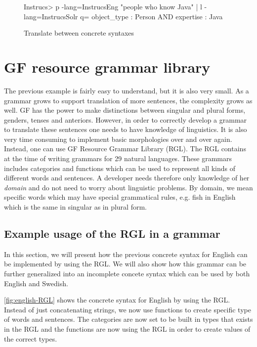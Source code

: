 \begin{figure}[H]
\begin{terminal}
Instrucs> p -lang=InstrucsEng "people who know Java" | l -lang=InstrucsSolr
q= object_type : Person AND expertise : Java
\end{terminal}
\caption{Translate between concrete syntaxes\label{fig:translation-concr}}
\end{figure}

\section{GF resource grammar library}

The previous example is fairly easy to understand, but it is also very small. As a grammar grows to support translation of more sentences, the complexity grows as well. GF has the power to make distinctions between singular and plural forms, genders, tenses and anteriors. However, in order to correctly develop a grammar to translate these sentences one needs to have knowledge of linguistics. It is also very time consuming to implement basic morphologies over and over again. Instead, one can use GF Resource Grammar Library (RGL)\cite{gf-rgl}. The RGL contains at the time of writing grammars for 29 natural languages. These grammars includes categories and functions which can be used to represent all kinds of different words and sentences. A developer needs therefore only knowledge of her \emph{domain} and do not need to worry about linguistic problems. By domain, we mean specific words which may have special grammatical rules, e.g. fish in English which is the same in singular as in plural form.

\subsection*{Example usage of the RGL in a grammar}

In this section, we will present how the previous concrete syntax for English can be implemented by using the RGL. We will also show how this grammar can be further generalized into an incomplete concete syntax which can be used by both English and Swedish.

\autoref{fig:english-RGL} shows the concrete syntax for English by using the RGL. Instead of just concatenating strings, we now use functions to create specific type of words and sentences. The categories are now set to be built in types that exists in the RGL and the functions are now using the RGL in order to create values of the correct types.

